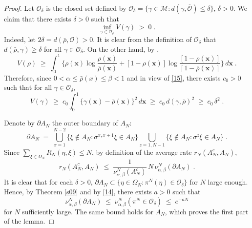 \documentclass[reqno]{amsart}
\begin{document}
\begin{proof}
Let ${{\mathscr O}}_\delta$ is the closed set defined by ${{\mathscr O}}_\delta =
\{\gamma \in {{\mathscr M}} : d(\gamma, \overline{{{\mathscr O}}})\le\delta\}$,
$\delta>0$. We claim that there exists $\delta>0$ such that
\begin{equation}
\label{14}
\inf_{\gamma \in {{\mathscr O}}_\delta} V(\gamma) \;>\;0\;.
\end{equation}
Indeed, let $2\delta = d(\bar\rho, {{\mathscr O}})>0$. It is clear from the
definition of ${{\mathscr O}}_\delta$ that $d(\bar\rho, \gamma) \ge \delta$ for
all $\gamma\in {{\mathscr O}}_\delta$.  On the other hand, by \cite[Theorem
A.1]{bdgjl3},
\begin{equation*}
V(\rho) \;\ge\; \int_0^1 \Big\{ \rho ({{\mathbf x}}) \log \frac{\rho ({{\mathbf x}})}
{\bar \rho ({{\mathbf x}})} + [1- \rho ({{\mathbf x}})] \log \frac{[1- \rho ({{\mathbf x}})]}
{[1- \bar \rho ({{\mathbf x}})]} \Big\}\, d{{\mathbf x}}\;.
\end{equation*}
Therefore, since $0<\alpha\le\bar\rho(x)\le\beta<1$ and in view of
\eqref{15}, there exists $c_0>0$ such that for all $\gamma\in {{\mathscr O}}_\delta$,
\begin{equation*}
V(\gamma) \;\ge\; c_0 \int_0^1 \big\{\gamma ({{\mathbf x}}) - \bar \rho ({{\mathbf x}})
\big\}^2 \, d{{\mathbf x}} \;\ge\; c_0\, d(\gamma,\bar\rho)^2
\;\ge\; c_0\, \delta^2\;.
\end{equation*}

Denote by $\partial A_N$ the outer boundary of $A_N$:
\begin{equation*}
\partial A_N \;=\; \bigcup_{x=1}^{N-2}
\big\{\xi\not\in A_N : \sigma^{x,x+1}\xi\in A_N\} 
\bigcup_{z=1, N-1} 
\big\{\xi\not\in A_N : \sigma^{z}\xi\in A_N\}\;.
\end{equation*}
Since $\sum_{\xi\in\Omega_N} R_N(\eta,\xi) \le N$, by definition of
the average rate $r_N(A^c_N,A_N)$,
\begin{equation*}
r_N(A^c_N,A_N)\;\le\; \frac 1{\nu^N_{\alpha, \beta}(A^c_N)}\,  
N\, \nu^N_{\alpha, \beta} (\partial A_N)\; . 
\end{equation*}
It is clear that for each $\delta>0$, $\partial A_N\subset \{\eta\in
\Omega_N : \pi^N(\eta)\in {{\mathscr O}}_\delta\}$ for $N$ large enough. Hence,
by Theorem \ref{s09} and by \eqref{14}, there exists $a>0$ such
that
\begin{equation*}
\nu^N_{\alpha, \beta}(\partial A_N) \;\le\; \nu^N_{\alpha,
  \beta}(\pi^N \in {{\mathscr O}}_\delta) \;\le\; e^{-aN}
\end{equation*}
for $N$ sufficiently large. The same bound holds for $A_N$, which
proves the first part of the lemma.
\end{proof}
\end{document}
